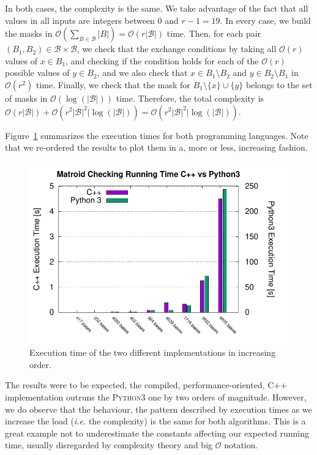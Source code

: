 \documentclass[11pt]{amsart}
\begin{document}
In both cases, the complexity is the same. We take advantage of the fact that all values in all inputs are integers between $0$ and $r - 1 = 19$. In every case, we build the masks in $\mathcal{O}(\sum_{B \in \mathcal{B}} |B|) = \mathcal{O}(r|\mathcal{B}|)$ time. Then, for each pair $(B_1, B_2) \in \mathcal{B} \times \mathcal{B}$, we check that the exchange conditions by taking all $\mathcal{O}(r)$ values of $x \in B_1$, and checking if the condition holds for each of the $\mathcal{O}(r)$ possible values of $y \in B_2$, and we also check that $x \in B_1 \setminus B_2$ and $y \in B_2 \setminus B_1$ in $\mathcal{O}(r^2)$ time. Finally, we check that the mask for $B_1 \setminus \{x\} \cup \{y\}$ belongs to the set of masks in $\mathcal{O}(\log(|\mathcal{B}|))$ time. Therefore, the total complexity is $\mathcal{O}(r |\mathcal{B}|) + \mathcal{O}(r^2 |\mathcal{B}|^2| \log(|\mathcal{B}|)) =  \mathcal{O}(r^2 |\mathcal{B}|^2| \log(|\mathcal{B}|))$.

Figure~\ref{fig:team-bearland-times} summarizes the execution times for both programming languages.
Note that we re-ordered the results to plot them in a, more or less, increasing fashion. 
\begin{figure}[h!]
    \centering
    \includegraphics[width=.7\textwidth]{./team-berland/exec_time.pdf}
    \caption{Execution time of the two different implementations in increasing order.\label{fig:team-bearland-times}}
\end{figure}
The results were to be expected, the compiled, performance-oriented, \textsc{C++} implementation outruns the \textsc{Python3} one by two orders of magnitude.
However, we do observe that the behaviour, the pattern described by execution times as we increase the load (\textit{i.e.} the complexity) is the same for both algorithms.
This is a great example not to underestimate the constants affecting our expected running time, usually disregarded by complexity theory and big $\mathcal{O}$ notation.
\end{document}
